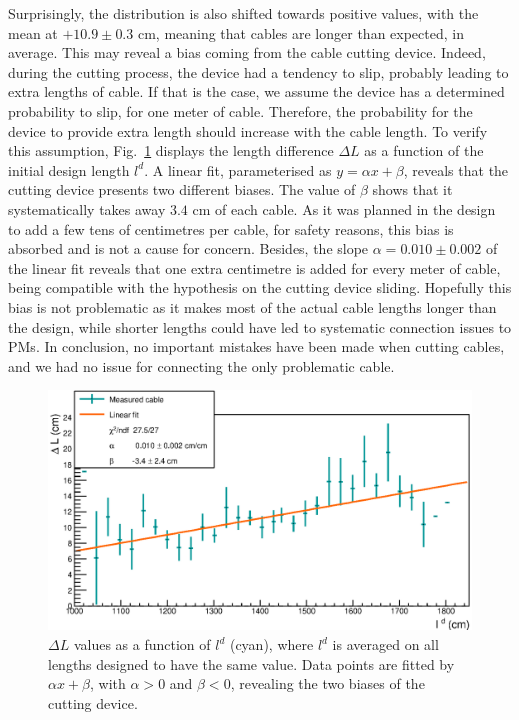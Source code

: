 Surprisingly, the distribution is also shifted towards positive values, with the mean at $+10.9\pm 0.3$ cm, meaning that cables are longer than expected, in average.
This may reveal a bias coming from the cable cutting device.
Indeed, during the cutting process, the device had a tendency to slip, probably leading to extra lengths of cable.
If that is the case, we assume the device has a determined probability to slip, for one meter of cable.
Therefore, the probability for the device to provide extra length should increase with the cable length.
To verify this assumption, Fig.~\ref{fig:CutBias} displays the length difference $\Delta L$ as a function of the initial design length $l^{d}$.
A linear fit, parameterised as $y = \alpha x + \beta$, reveals that the cutting device presents two different biases.
The value of $\beta$ shows that it systematically takes away $3.4$ cm of each cable.
As it was planned in the design to add a few tens of centimetres per cable, for safety reasons, this bias is absorbed and is not a cause for concern.
Besides, the slope $\alpha = 0.010\pm 0.002$ of the linear fit reveals that one extra centimetre is added for every meter of cable, being compatible with the hypothesis on the cutting device sliding.
Hopefully this bias is not problematic as it makes most of the actual cable lengths longer than the design, while shorter lengths could have led to systematic connection issues to PMs.
In conclusion, no important mistakes have been made when cutting cables, and we had no issue for connecting the only problematic cable.
\begin{figure}[h!]
  \centering
  \includegraphics[width=15cm]{commissioning/fig_commissioning/cut_biais.eps}
  \caption{$\Delta L$ values as a function of $l^{d}$ (cyan), where $l^{d}$ is averaged on all lengths designed to have the same value.
    Data points are fitted by $\alpha x + \beta$, with $\alpha > 0$ and $\beta < 0$, revealing the two biases of the cutting device.
    \label{fig:CutBias}}
\end{figure}

